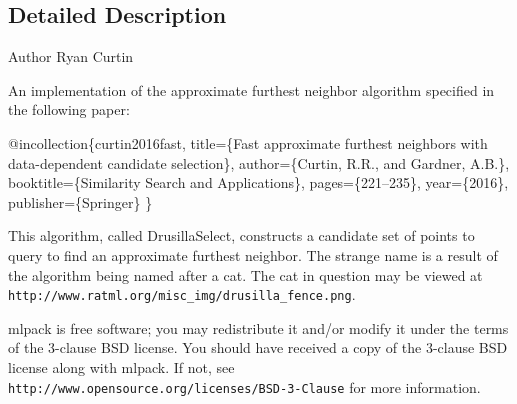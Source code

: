 \subsection{Detailed Description}
\begin{DoxyAuthor}{Author}
Ryan Curtin
\end{DoxyAuthor}
An implementation of the approximate furthest neighbor algorithm specified in the following paper\+:


\begin{DoxyCode}
@incollection\{curtin2016fast,
  title=\{Fast approximate furthest neighbors with data-dependent candidate
         selection\},
  author=\{Curtin, R.R., and Gardner, A.B.\},
  booktitle=\{Similarity Search and Applications\},
  pages=\{221--235\},
  year=\{2016\},
  publisher=\{Springer\}
\}
\end{DoxyCode}


This algorithm, called Drusilla\+Select, constructs a candidate set of points to query to find an approximate furthest neighbor. The strange name is a result of the algorithm being named after a cat. The cat in question may be viewed at {\tt http\+://www.\+ratml.\+org/misc\+\_\+img/drusilla\+\_\+fence.\+png}.

mlpack is free software; you may redistribute it and/or modify it under the terms of the 3-\/clause B\+SD license. You should have received a copy of the 3-\/clause B\+SD license along with mlpack. If not, see {\tt http\+://www.\+opensource.\+org/licenses/\+B\+S\+D-\/3-\/\+Clause} for more information. 